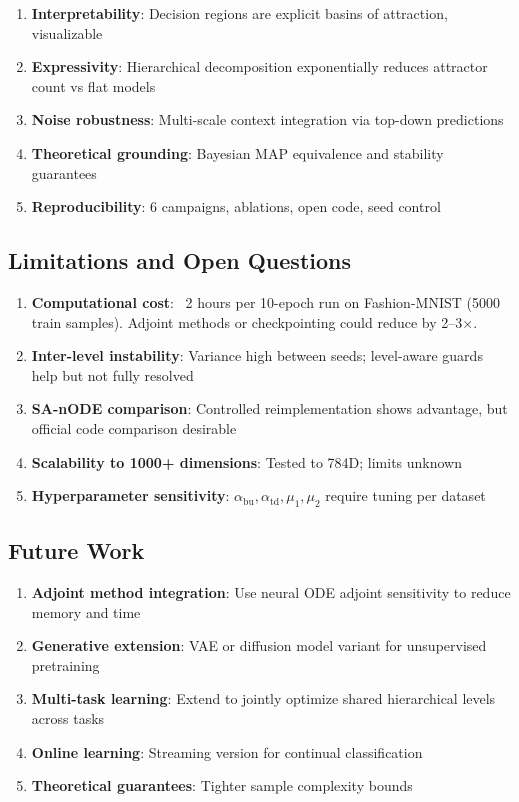 \documentclass[11pt,a4paper]{article}
\begin{document}
\begin{enumerate}
  \item \textbf{Interpretability}: Decision regions are explicit basins of attraction, visualizable
  \item \textbf{Expressivity}: Hierarchical decomposition exponentially reduces attractor count vs flat models
  \item \textbf{Noise robustness}: Multi-scale context integration via top-down predictions
  \item \textbf{Theoretical grounding}: Bayesian MAP equivalence and stability guarantees
  \item \textbf{Reproducibility}: 6 campaigns, ablations, open code, seed control
\end{enumerate}

\subsection{Limitations and Open Questions}

\begin{enumerate}
  \item \textbf{Computational cost}: ~2 hours per 10-epoch run on Fashion-MNIST (5000 train samples). Adjoint methods or checkpointing could reduce by 2–3×.
  \item \textbf{Inter-level instability}: Variance high between seeds; level-aware guards help but not fully resolved
  \item \textbf{SA-nODE comparison}: Controlled reimplementation shows advantage, but official code comparison desirable
  \item \textbf{Scalability to 1000+ dimensions}: Tested to 784D; limits unknown
  \item \textbf{Hyperparameter sensitivity}: $\alpha_{\text{bu}}, \alpha_{\text{td}}, \mu_1, \mu_2$ require tuning per dataset
\end{enumerate}

\subsection{Future Work}

\begin{enumerate}
  \item \textbf{Adjoint method integration}: Use neural ODE adjoint sensitivity to reduce memory and time
  \item \textbf{Generative extension}: VAE or diffusion model variant for unsupervised pretraining
  \item \textbf{Multi-task learning}: Extend to jointly optimize shared hierarchical levels across tasks
  \item \textbf{Online learning}: Streaming version for continual classification
  \item \textbf{Theoretical guarantees}: Tighter sample complexity bounds
\end{enumerate}
\end{document}

